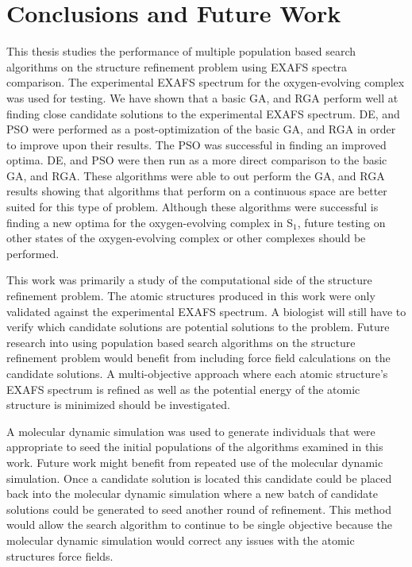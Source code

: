\chapter{Conclusions and Future Work}

This thesis studies the performance of multiple population based search algorithms on the structure refinement problem using EXAFS spectra comparison. The experimental EXAFS spectrum for the oxygen-evolving complex was used for testing. We have shown that a basic GA, and RGA perform well at finding close candidate solutions to the experimental EXAFS spectrum. DE, and PSO were performed as a post-optimization of the basic GA, and RGA in order to improve upon their results. The PSO was successful in finding an improved optima. DE, and PSO were then run as a more direct comparison to the basic GA, and RGA. These algorithms were able to out perform the GA, and RGA results showing that algorithms that perform on a continuous space are better suited for this type of problem. Although these algorithms were successful is finding a new optima for the oxygen-evolving complex in S$_{1}$, future testing on other states of the oxygen-evolving complex or other complexes should be performed.

This work was primarily a study of the computational side of the structure refinement problem. The atomic structures produced in this work were only validated against the experimental EXAFS spectrum. A biologist will still have to verify which candidate solutions are potential solutions to the problem. Future research into using population based search algorithms on the structure refinement problem would benefit from including force field calculations on the candidate solutions. A multi-objective approach where each atomic structure's EXAFS spectrum is refined as well as the potential energy of the atomic structure is minimized should be investigated.

A molecular dynamic simulation was used to generate individuals that were appropriate to seed the initial populations of the algorithms examined in this work. Future work might benefit from repeated use of the molecular dynamic simulation. Once a candidate solution is located this candidate could be placed back into the molecular dynamic simulation where a new batch of candidate solutions could be generated to seed another round of refinement. This method would allow the search algorithm to continue to be single objective because the molecular dynamic simulation would correct any issues with the atomic structures force fields.